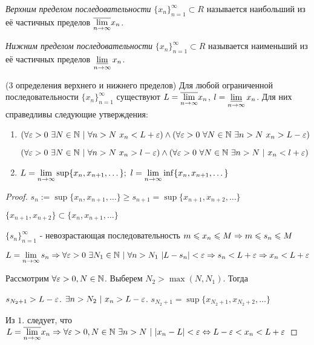 \begin{definition}
	\textit{Верхним пределом последовательности} $\{x_n\}_{n = 1}^\infty \subset R$ называется наибольший из её частичных пределов $\overline{\lim\limits_{n \rightarrow \infty}} x_n$.
\end{definition}

\begin{definition}
	\textit{Нижним пределом последовательности} $\{x_n\}_{n = 1}^\infty \subset R$ называется наименьший из её частичных пределов $\varliminf\limits_{n \rightarrow \infty} x_n$.
\end{definition}

\begin{theorem} (3 определения верхнего и нижнего пределов)
	Для любой ограниченной последовательности $\{x_n\}_{n = 1}^\infty$ существуют $L = \overline{\lim\limits_{n \to \infty}} x_n$, $l = \varliminf\limits_{n \to \infty} x_n$. Для них справедливы следующие утверждения:
	\begin{enumerate}
		\item $(\forall \eps > 0\ \exists N \in \N\ |\ \forall n > N\ x_n < L + \eps) \wedge (\forall \eps > 0\ \forall N \in \N\ \exists n > N\ x_n > L - \eps)$
		
		$(\forall \eps > 0\ \exists N \in \N\ |\ \forall n > N\ x_n > l - \eps) \wedge (\forall \eps > 0\ \forall N \in \N\ \exists n > N\ |\ x_n < l + \eps)$
		
		\item $L = \lim\limits_{n \rightarrow \infty} \sup \{x_n, x_{n + 1}, \dots\};\ l = \lim\limits_{n \rightarrow \infty} \inf \{x_n, x_{n + 1}, \dots\}$
	\end{enumerate}
\end{theorem}

\begin{proof}
	$s_n := \sup \{x_n, x_{n + 1}, \dots\} \ge s_{n + 1} = \sup \{x_{n + 1}, x_{n + 2}, \dots\}$
	
	$\{x_{n + 1}, x_{n + 2}\} \subset \{x_n, x_{n + 1}, \dots\}$
	
	$\{s_n\}_{n = 1}^\infty$ - невозрастающая последовательность $m \leqslant x_n \leqslant M \Rightarrow m \leqslant s_n \leqslant M$
	
	$L = \lim\limits_{n \rightarrow \infty} s_n \Rightarrow \forall \varepsilon > 0\ \exists N_1 \in \mathbb{N}\ |\ \forall n > N_1\ |L - s_n| < \varepsilon \Rightarrow s_n < L + \varepsilon \Rightarrow x_n < L + \varepsilon$
	
	Рассмотрим $\forall \varepsilon > 0, N \in \mathbb{N}$. Выберем $N_2 > \max(N, N_1)$. Тогда
	
	$s_{N_2 + 1} > L - \varepsilon$. $\exists n > N_2\ |\ x_n > L - \varepsilon$.
	$s_{N_2 + 1} = \sup \{x_{N_2 + 1}, x_{N_2 + 2}, \dots\}$
	
	Из $1.$ следует, что $L = \overline{\liml_{n \ra \infty}} x_n \Ra \forall \eps > 0, N \in \N\ \exists n > N\ |\ |x_n - L| < \eps \lra L - \eps < x_n < L + \eps$
	
\end{proof}

